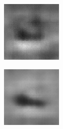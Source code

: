 \begin{figure}[H]
\begin{subfigure}[t]{0.15\textwidth}
  \end{subfigure}
  \begin{subfigure}[t]{0.15\textwidth}
    \includegraphics[width=\linewidth]{img/one-trial/prediction_3_cnnv1.png}
  \end{subfigure}
  \begin{subfigure}[t]{0.15\textwidth}
    \includegraphics[width=\linewidth]{img/one-trial/prediction_3_cnnv2.png}

\end{subfigure}
\end{figure}

